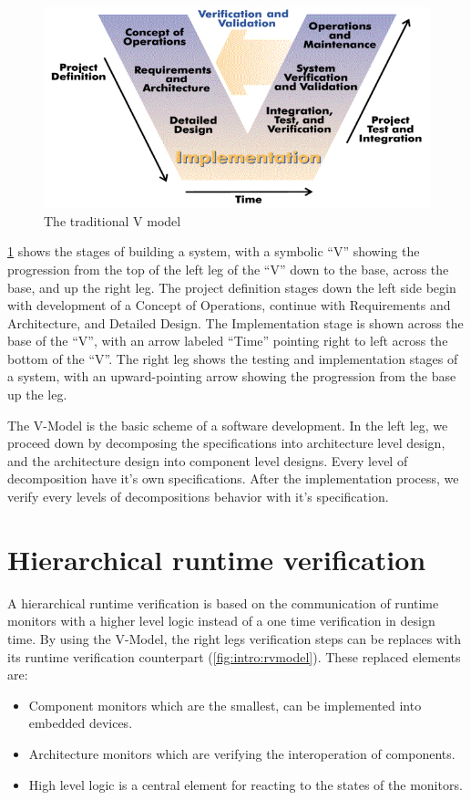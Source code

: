 \begin{figure}[h]
	\centering
	\includegraphics[width=0.8\linewidth]{include/figures/chapter_1/VModel}
	\caption{The traditional V model \cite{vmodel}}
	\label{fig:intro:vmodel}
\end{figure}

\cref{fig:intro:vmodel} shows the stages of building a system, with a symbolic “V” showing the progression from the top of the left leg of the ``V'' down to the base, across the base, and up the right leg. The project definition stages down the left side begin with development of a Concept of Operations, continue with Requirements and Architecture, and Detailed Design. The Implementation stage is shown across the base of the ``V'', with an arrow labeled ``Time'' pointing right to left across the bottom of the ``V''. The right leg shows the testing and implementation stages of a system, with an upward-pointing arrow showing the progression from the base up the leg. \cite{vmodel}

The V-Model is the basic scheme of a software development. In the left leg, we proceed down by decomposing the specifications into architecture level design, and the architecture design into component level designs. Every level of decomposition have it's own specifications. After the implementation process, we verify every levels of decompositions behavior with it's specification.

\section*{Hierarchical runtime verification}

A hierarchical runtime verification is based on the communication of runtime monitors with a higher level logic instead of a one time verification in design time. By using the V-Model, the right legs verification steps can be replaces with its runtime verification counterpart (\cref{fig:intro:rvmodel}).
These replaced elements are:
\begin{itemize}
	\item Component monitors which are the smallest, can be implemented into embedded devices.
	\item Architecture monitors which are verifying the interoperation of components.
	\item High level logic is a central element for reacting to the states of the monitors.
\end{itemize}

